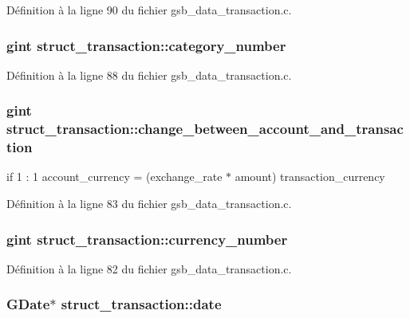 Définition à la ligne 90 du fichier gsb\_\-data\_\-transaction.c.

\subsubsection[{category\_\-number}]{\setlength{\rightskip}{0pt plus 5cm}gint {\bf struct\_\-transaction::category\_\-number}}\label{structstruct__transaction_aef380fa8ba617e61ea31b262e93415b1}


Définition à la ligne 88 du fichier gsb\_\-data\_\-transaction.c.

\subsubsection[{change\_\-between\_\-account\_\-and\_\-transaction}]{\setlength{\rightskip}{0pt plus 5cm}gint {\bf struct\_\-transaction::change\_\-between\_\-account\_\-and\_\-transaction}}\label{structstruct__transaction_aab2c9329f0d87630c10fe3003ea108fd}
if 1 : 1 account\_\-currency = (exchange\_\-rate $\ast$ amount) transaction\_\-currency 

Définition à la ligne 83 du fichier gsb\_\-data\_\-transaction.c.

\subsubsection[{currency\_\-number}]{\setlength{\rightskip}{0pt plus 5cm}gint {\bf struct\_\-transaction::currency\_\-number}}\label{structstruct__transaction_a515e646646391127a82740351fd8a311}


Définition à la ligne 82 du fichier gsb\_\-data\_\-transaction.c.

\subsubsection[{date}]{\setlength{\rightskip}{0pt plus 5cm}GDate$\ast$ {\bf struct\_\-transaction::date}}\label{structstruct__transaction_a0f11b6fe27d26af4732f328b8560dd42}


